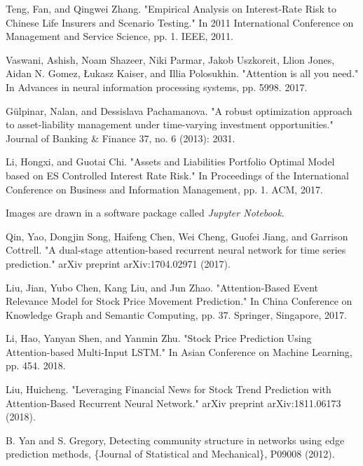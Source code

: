 \begin{thebibliography}{1}
		 
		\footnotesize
		
		Teng, Fan, and Qingwei Zhang. "Empirical Analysis on Interest-Rate Risk to Chinese Life Insurers and Scenario Testing." In 2011 International Conference on Management and Service Science, pp. 1. IEEE, 2011.

		
		Vaswani, Ashish, Noam Shazeer, Niki Parmar, Jakob Uszkoreit, Llion Jones, Aidan N. Gomez, Łukasz Kaiser, and Illia Polosukhin. "Attention is all you need." In Advances in neural information processing systems, pp. 5998. 2017.

		
		 Gülpinar, Nalan, and Dessislava Pachamanova. "A robust optimization approach to asset-liability management under time-varying investment opportunities." Journal of Banking \& Finance 37, no. 6 (2013): 2031.
		
		Li, Hongxi, and Guotai Chi. "Assets and Liabilities Portfolio Optimal Model based on ES Controlled Interest Rate Risk." In Proceedings of the International Conference on Business and Information Management, pp. 1. ACM, 2017.
		
		
		Images are drawn in a software package called \emph{Jupyter Notebook}.
		
		 Qin, Yao, Dongjin Song, Haifeng Chen, Wei Cheng, Guofei Jiang, and Garrison Cottrell. "A dual-stage attention-based recurrent neural network for time series prediction." arXiv preprint arXiv:1704.02971 (2017).
		
		 Liu, Jian, Yubo Chen, Kang Liu, and Jun Zhao. "Attention-Based Event Relevance Model for Stock Price Movement Prediction." In China Conference on Knowledge Graph and Semantic Computing, pp. 37. Springer, Singapore, 2017.
		  
		 Li, Hao, Yanyan Shen, and Yanmin Zhu. "Stock Price Prediction Using Attention-based Multi-Input LSTM." In Asian Conference on Machine Learning, pp. 454. 2018.

		Liu, Huicheng. "Leveraging Financial News for Stock Trend Prediction with Attention-Based Recurrent Neural Network." arXiv preprint arXiv:1811.06173 (2018).
		
		 B. Yan and S. Gregory, Detecting community structure in networks using edge prediction methods, \{Journal of Statistical and Mechanical\}, P09008 (2012).
		 

\end{thebibliography}
